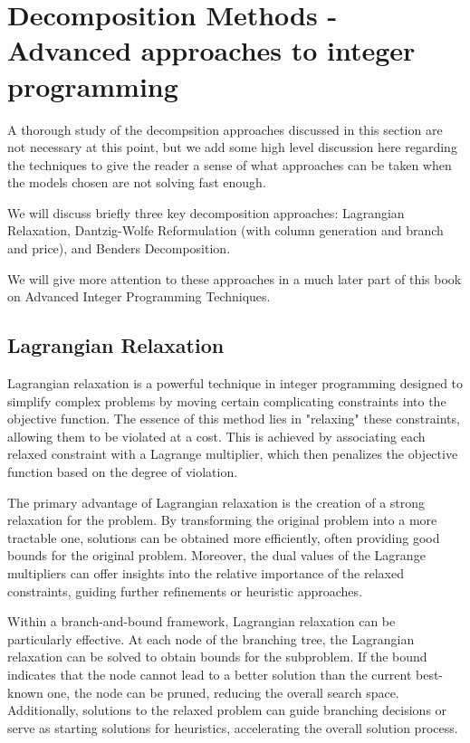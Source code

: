 \section{Decomposition Methods - Advanced approaches to integer programming}
\begin{outcome}
A thorough study of the decompsition approaches discussed in this section are not necessary at this point, but we add some high level discussion here regarding the techniques to give the reader a sense of what approaches can be taken when the models chosen are not solving fast enough.  
\end{outcome}

We will discuss briefly three key decomposition approaches: Lagrangian Relaxation, Dantzig-Wolfe Reformulation (with column generation and branch and price), and Benders Decomposition.

We will give more attention to these approaches in a much later part of this book on Advanced Integer Programming Techniques.

\subsection{Lagrangian Relaxation}

Lagrangian relaxation is a powerful technique in integer programming designed to simplify complex problems by moving certain complicating constraints into the objective function. The essence of this method lies in "relaxing" these constraints, allowing them to be violated at a cost. This is achieved by associating each relaxed constraint with a Lagrange multiplier, which then penalizes the objective function based on the degree of violation.

The primary advantage of Lagrangian relaxation is the creation of a strong relaxation for the problem. By transforming the original problem into a more tractable one, solutions can be obtained more efficiently, often providing good bounds for the original problem. Moreover, the dual values of the Lagrange multipliers can offer insights into the relative importance of the relaxed constraints, guiding further refinements or heuristic approaches.

Within a branch-and-bound framework, Lagrangian relaxation can be particularly effective. At each node of the branching tree, the Lagrangian relaxation can be solved to obtain bounds for the subproblem. If the bound indicates that the node cannot lead to a better solution than the current best-known one, the node can be pruned, reducing the overall search space. Additionally, solutions to the relaxed problem can guide branching decisions or serve as starting solutions for heuristics, accelerating the overall solution process.

